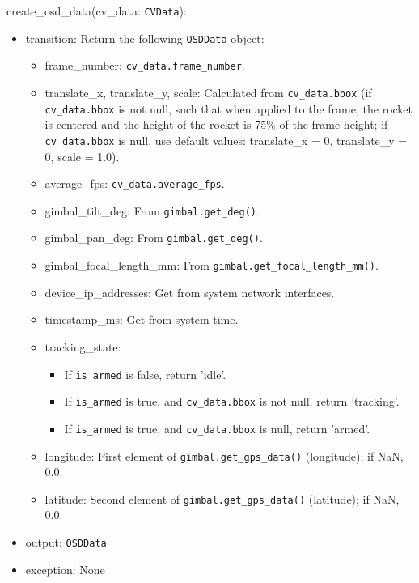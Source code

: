 \documentclass[12pt, titlepage]{article}
\begin{document}
\noindent create\_osd\_data(cv\_data: \texttt{CVData}):
\begin{itemize}
  \item transition: Return the following \texttt{OSDData} object:
        \begin{itemize}
          \item frame\_number: \texttt{cv\_data.frame\_number}.
          \item translate\_x, translate\_y, scale: Calculated from \texttt{cv\_data.bbox} (if
                \texttt{cv\_data.bbox} is not null, such that when applied to the frame, the
                rocket is centered and the height of the rocket is 75\% of the frame height; if
                \texttt{cv\_data.bbox} is null, use default values: translate\_x = 0,
                translate\_y = 0, scale = 1.0).
          \item average\_fps: \texttt{cv\_data.average\_fps}.
          \item gimbal\_tilt\_deg: From \texttt{gimbal.get\_deg()}.
          \item gimbal\_pan\_deg: From \texttt{gimbal.get\_deg()}.
          \item gimbal\_focal\_length\_mm: From \texttt{gimbal.get\_focal\_length\_mm()}.
          \item device\_ip\_addresses: Get from system network interfaces.
          \item timestamp\_ms: Get from system time.
          \item tracking\_state:
                \begin{itemize}
                  \item If \texttt{is\_armed} is false, return 'idle'.
                  \item If \texttt{is\_armed} is true, and \texttt{cv\_data.bbox} is not null, return
                        'tracking'.
                  \item If \texttt{is\_armed} is true, and \texttt{cv\_data.bbox} is null, return
                        'armed'.
                \end{itemize}
          \item longitude: First element of \texttt{gimbal.get\_gps\_data()} (longitude); if
                NaN, 0.0.
          \item latitude: Second element of \texttt{gimbal.get\_gps\_data()} (latitude); if
                NaN, 0.0.
        \end{itemize}
  \item output: \texttt{OSDData}
  \item exception: None
\end{itemize}
\end{document}
